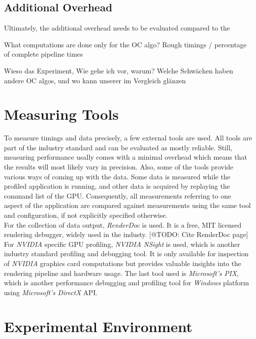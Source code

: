 \subsection*{Additional Overhead}

Ultimately, the additional overhead needs to be evaluated compared to the 

What computations are done only for the OC algo?
Rough timings / percentage of complete pipeline times


Wieso das Experiment,
Wie gehe ich vor, warum?
Welche Schwächen haben andere OC algos, und wo kann unserer im Vergleich glänzen


\section{Measuring Tools}

To measure timings and data precisely, a few external tools are used. All tools are part of the industry 
standard and can be evaluated as mostly reliable. Still, measuring performance usally comes with a minimal 
overhead which means that the results will most likely vary in precision. Also, some of the tools provide 
various ways of coming up with the data. Some data is measured while the profiled application is running, 
and other data is acquired by replaying the command list of the \ac{GPU}. Consequently, all measurements 
referring to one aspect of the application are compared against measurements using the same tool and 
configuration, if not explicitly specified otherwise. \\

\noindent
For the collection of data output, \emph{RenderDoc} is used. It is a free, MIT licensed rendering debugger,
widely used in the industy. [@TODO: Cite RenderDoc page]
For \emph{NVIDIA} specific \ac{GPU} profiling, \emph{NVIDIA NSight} is used, which is another industry standard 
profiling and debugging tool. It is only available for inspection of \emph{NVIDIA} graphics card computations but 
provides valuable insights into the rendering pipeline and hardware usage. 
The last tool used is \emph{Microsoft's PIX}, which is another performance debugging and profiling tool for 
\emph{Windows} platform using \emph{Microsoft's DirectX} \ac{API}. 


\section{Experimental Environment} \label{sec-experimental-environment}

